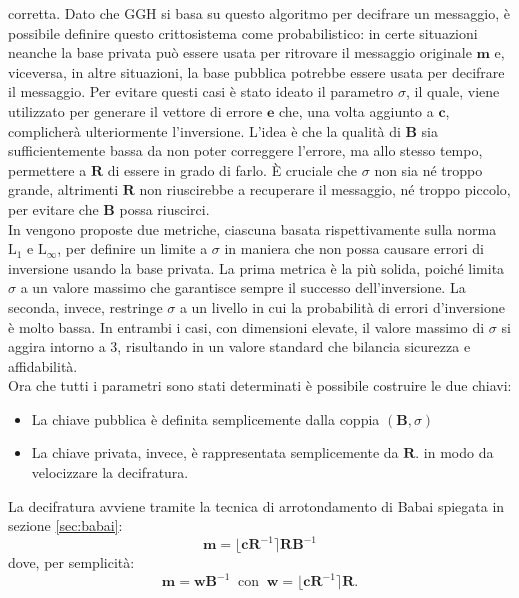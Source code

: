 corretta. Dato che GGH si basa su questo algoritmo per decifrare un messaggio, è possibile
definire questo crittosistema come probabilistico: in certe situazioni neanche la base
privata può essere usata per ritrovare il messaggio originale $\mathbf{m}$ e, viceversa, 
in altre situazioni, la base pubblica potrebbe essere usata per decifrare il messaggio. 
Per evitare questi casi è stato ideato il parametro $\sigma$, il 
quale, viene utilizzato per generare il vettore di errore $\mathbf{e}$ che, una volta 
aggiunto a $\mathbf{c}$, complicherà ulteriormente l'inversione. L'idea è che la
qualità di $\mathbf{B}$ sia sufficientemente bassa da non poter correggere l'errore,
ma allo stesso tempo, permettere a $\mathbf{R}$ di essere in grado di farlo. 
È cruciale che $\sigma$ non sia né troppo grande, altrimenti $\mathbf{R}$ non riuscirebbe 
a recuperare il messaggio, né troppo piccolo, per evitare che $\mathbf{B}$ possa riuscirci.
\\
\label{subsec:sigmametrics}
In \cite[sezione 3.2]{GGH97} vengono proposte due metriche, ciascuna basata rispettivamente
sulla norma $\text{L}_1$ e $\text{L}_\infty$, per definire un limite a
$\sigma$ in maniera che non possa causare errori di inversione usando la base privata.
La prima metrica è la più solida, poiché limita $\sigma$ a un valore massimo che garantisce 
sempre il successo dell'inversione. La seconda, invece, restringe $\sigma$ a un livello 
in cui la probabilità di errori d'inversione è molto bassa. In entrambi i casi, con 
dimensioni elevate, il valore massimo di $\sigma$ si aggira intorno a 3, risultando in un 
valore standard che bilancia sicurezza e affidabilità.
\\
Ora che tutti i parametri sono stati determinati è possibile costruire le due chiavi:
\begin{itemize}
    \item La chiave pubblica è definita semplicemente dalla coppia $(\mathbf{B}, \sigma)$
    \item La chiave privata, invece, è rappresentata semplicemente da $\mathbf{R}$. 
    in modo da velocizzare la decifratura.
\end{itemize}
La decifratura avviene tramite la tecnica di arrotondamento di Babai spiegata in sezione 
\ref{sec:babai}:
\[
    \mathbf{m} =  \lfloor \mathbf{c}\mathbf{R}^{-1}\rceil \mathbf{R} \mathbf{B}^{-1}
\]
dove, per semplicità:
\[
    \mathbf{m} = \mathbf{w}\mathbf{B}^{-1}
    \ \text{ con } \ \mathbf{w} = \lfloor\mathbf{c}\mathbf{R}^{-1}\rceil\mathbf{R}.
\]
